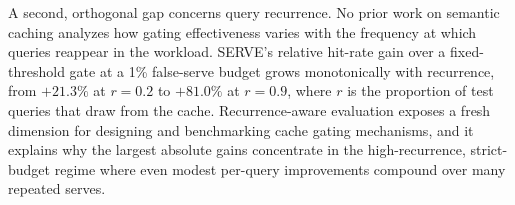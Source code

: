 A second, orthogonal gap concerns query recurrence. No prior work on
semantic caching analyzes how gating effectiveness varies with the
frequency at which queries reappear in the workload. SERVE's relative
hit-rate gain over a fixed-threshold gate at a 1\% false-serve budget
grows monotonically with recurrence, from $+21.3\%$ at $r=0.2$ to
$+81.0\%$ at $r=0.9$, where $r$ is the proportion of test queries that
draw from the cache.
Recurrence-aware evaluation exposes a fresh dimension for designing and
benchmarking cache gating mechanisms, and it explains why the largest
absolute gains concentrate in the high-recurrence, strict-budget regime
where even modest per-query improvements compound over many repeated
serves.
